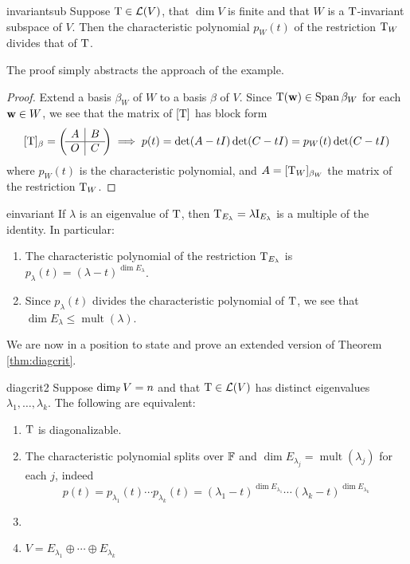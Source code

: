 \begin{thm}{}{invariantsub}
	Suppose $\mathrm{T}\in\mathcal{L}(V)$, that $\dim V$ is finite and that $W$ is a $\mathrm{T}$-invariant subspace of $V$. Then the characteristic polynomial $p_W(t)$ of the restriction $\mathrm{T}_W$ divides that of $\mathrm{T}$.
\end{thm}


The proof simply abstracts the approach of the example.


\begin{proof}
	Extend a basis $\beta_W$ of $W$ to a basis $\beta$ of $V$. Since $\mathrm{T}({\mathbf{w}})\in\operatorname{Span}\beta_W$ for each ${\mathbf{w}}\in W$, we see that the matrix of $[\mathrm{T}]$ has block form
  \[
  	[\mathrm{T}]_\beta=\left(\!
  	\begin{array}{c|c}
  		A&B\\\hline
  		O&C
  	\end{array}
  	\!\right)
  	\implies p(t)=\det(A-tI)\det(C-tI)=p_W(t)\det(C-tI)
  \]
  where $p_W(t)$ is the characteristic polynomial, and $A=[\mathrm{T}_W]_{\beta_W}$ the matrix of the restriction $\mathrm{T}_W$.
\end{proof}


\begin{cor}{}{einvariant}
	If $\lambda$ is an eigenvalue of $\mathrm{T}$, then $\mathrm{T}_{E_\lambda}=\lambda\mathrm{I}_{E_\lambda}$ is a multiple of the identity. In particular:
	\begin{enumerate}
	  \item The characteristic polynomial of the restriction $\mathrm{T}_{E_\lambda}$ is $p_\lambda(t)=(\lambda-t)^{\dim E_\lambda}$.
	  \item Since $p_\lambda(t)$ divides the characteristic polynomial of $\mathrm{T}$, we see that $\dim E_\lambda\le\operatorname{mult}(\lambda)$.
	\end{enumerate}
\end{cor}


We are now in a position to state and prove an extended version of Theorem \ref{thm:diagcrit}.

\begin{thm}{}{diagcrit2}
	Suppose $\dim_{\mathbb{F}} V=n$ and that $\mathrm{T}\in\mathcal{L}(V)$ has distinct eigenvalues $\lambda_1,\ldots,\lambda_k$. The following are equivalent:
  \begin{enumerate}
    \item $\mathrm{T}$ is diagonalizable.
    \item The characteristic polynomial splits over $\mathbb{F}$ and $\dim E_{\lambda_j}=\operatorname{mult}(\lambda_j)$ for each $j$, indeed
    \[
    	p(t)=p_{\lambda_1}(t)\cdots p_{\lambda_k}(t)
    	=(\lambda_1-t)^{\dim E_{\lambda_1}} \cdots (\lambda_k-t)^{\dim E_{\lambda_k}}
    \]
    \item {}
    \item $V=E_{\lambda_1}\oplus \cdots\oplus E_{\lambda_k}$
	\end{enumerate}
\end{thm}


